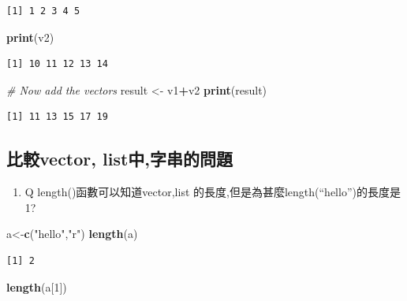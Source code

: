 \documentclass[]{book}
\newenvironment{Shaded}{\begin{snugshade}}{\end{snugshade}}
\newcommand{\CommentTok}[1]{\textcolor[rgb]{0.56,0.35,0.01}{\textit{#1}}}
\newcommand{\DecValTok}[1]{\textcolor[rgb]{0.00,0.00,0.81}{#1}}
\newcommand{\KeywordTok}[1]{\textcolor[rgb]{0.13,0.29,0.53}{\textbf{#1}}}
\newcommand{\NormalTok}[1]{#1}
\newcommand{\OperatorTok}[1]{\textcolor[rgb]{0.81,0.36,0.00}{\textbf{#1}}}
\newcommand{\StringTok}[1]{\textcolor[rgb]{0.31,0.60,0.02}{#1}}
\providecommand{\tightlist}{%
  \setlength{\itemsep}{0pt}\setlength{\parskip}{0pt}}
\theoremstyle{definition}
\theoremstyle{definition}
\theoremstyle{definition}
\theoremstyle{remark}
\begin{document}
\begin{verbatim}
[1] 1 2 3 4 5
\end{verbatim}

\begin{Shaded}
\begin{Highlighting}[]
\KeywordTok{print}\NormalTok{(v2)}
\end{Highlighting}
\end{Shaded}

\begin{verbatim}
[1] 10 11 12 13 14
\end{verbatim}

\begin{Shaded}
\begin{Highlighting}[]
\CommentTok{# Now add the vectors}
\NormalTok{result <-}\StringTok{ }\NormalTok{v1}\OperatorTok{+}\NormalTok{v2}
\KeywordTok{print}\NormalTok{(result)}
\end{Highlighting}
\end{Shaded}

\begin{verbatim}
[1] 11 13 15 17 19
\end{verbatim}

\hypertarget{vector-list}{%
\subsection{比較vector, list中,字串的問題}\label{vector-list}}

\begin{enumerate}
\def\labelenumi{\arabic{enumi}.}
\tightlist
\item
  Q length()函數可以知道vector,list
  的長度,但是為甚麼length(``hello'')的長度是1?
\end{enumerate}

\begin{Shaded}
\begin{Highlighting}[]
\NormalTok{a<-}\KeywordTok{c}\NormalTok{(}\StringTok{"hello"}\NormalTok{,}\StringTok{"r"}\NormalTok{)}
\KeywordTok{length}\NormalTok{(a)}
\end{Highlighting}
\end{Shaded}

\begin{verbatim}
[1] 2
\end{verbatim}

\begin{Shaded}
\begin{Highlighting}[]
\KeywordTok{length}\NormalTok{(a[}\DecValTok{1}\NormalTok{])}
\end{Highlighting}
\end{Shaded}
\end{document}
